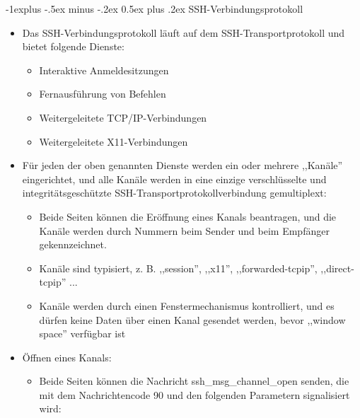 \documentclass[a4paper]{article}
\makeatletter
\renewcommand{\subsection}{\@startsection{subsection}{2}{0mm}%
 {-1explus -.5ex minus -.2ex}%
 {0.5ex plus .2ex}%
 {\normalfont\normalsize\bfseries}}
\makeatother
\begin{document}
\begin{multicols}{3}
    \subsection{SSH-Verbindungsprotokoll}

    \begin{itemize}
        \item
              Das SSH-Verbindungsprotokoll läuft auf dem SSH-Transportprotokoll und
              bietet folgende Dienste:

              \begin{itemize}
                  \item
                        Interaktive Anmeldesitzungen
                  \item
                        Fernausführung von Befehlen
                  \item
                        Weitergeleitete TCP/IP-Verbindungen
                  \item
                        Weitergeleitete X11-Verbindungen
              \end{itemize}
        \item
              Für jeden der oben genannten Dienste werden ein oder mehrere
              ,,Kanäle'' eingerichtet, und alle Kanäle werden in eine einzige
              verschlüsselte und integritätsgeschützte
              SSH-Transportprotokollverbindung gemultiplext:

              \begin{itemize}
                  \item
                        Beide Seiten können die Eröffnung eines Kanals beantragen, und die
                        Kanäle werden durch Nummern beim Sender und beim Empfänger
                        gekennzeichnet.
                  \item
                        Kanäle sind typisiert, z. B. ,,session'', ,,x11'',
                        ,,forwarded-tcpip'', ,,direct-tcpip'' ...
                  \item
                        Kanäle werden durch einen Fenstermechanismus kontrolliert, und es
                        dürfen keine Daten über einen Kanal gesendet werden, bevor ,,window
                        space'' verfügbar ist
              \end{itemize}
        \item
              Öffnen eines Kanals:

              \begin{itemize}
                  \item
                        Beide Seiten können die Nachricht ssh\_msg\_channel\_open senden,
                        die mit dem Nachrichtencode 90 und den folgenden Parametern
                        signalisiert wird:


\end{itemize}
\end{itemize}
\end{multicols}
\end{document}
